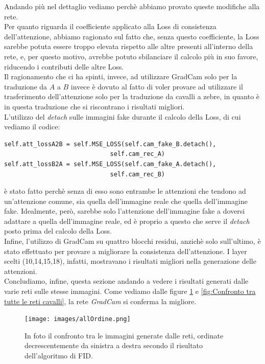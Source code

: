 Andando più nel dettaglio vediamo perchè abbiamo provato queste modifiche alla rete.
\\Per quanto riguarda il coefficiente applicato alla Loss di consistenza dell'attenzione, abbiamo ragionato sul fatto che, senza questo coefficiente, la Loss sarebbe potuta essere troppo elevata rispetto alle altre presenti all'interno della rete, e, per questo motivo, avrebbe potuto sbilanciare il calcolo più in suo favore, riducendo i contributi delle altre Loss.
\\Il ragionamento che ci ha spinti, invece, ad utilizzare GradCam solo per la traduzione da $A$ a $B$ invece è dovuto al fatto di voler provare ad utilizzare il trasferimento dell'attenzione solo per la traduzione da cavalli a zebre, in quanto è in questa traduzione che si riscontrano i risultati migliori.
\\L'utilizzo del \emph{detach} sulle immagini fake durante il calcolo della Loss, di cui vediamo il codice:
\begin{verbatim}
self.att_lossA2B = self.MSE_LOSS(self.cam_fake_B.detach(),
                             self.cam_rec_A)
self.att_lossB2A = self.MSE_LOSS(self.cam_fake_A.detach(),
                             self.cam_rec_B)
\end{verbatim}
è stato fatto perchè senza di esso sono entrambe le attenzioni che tendono ad un'attenzione comune, sia quella dell'immagine reale che quella dell'immagine fake. Idealmente, però, sarebbe solo l'attenzione dell'immagine fake a doversi adattare a quella dell'immagine reale, ed è proprio a questo che serve il \emph{detach} posto prima del calcolo della Loss.
\\Infine, l'utilizzo di GradCam su quattro blocchi residui, anzichè solo sull'ultimo, è stato effettuato per provare a migliorare la consistenza dell'attenzione. I layer scelti (10,14,15,18), infatti, mostravano i risultati migliori nella generazione delle attenzioni.
\\Concludiamo, infine, questa sezione andando a vedere i risultati generati dalle varie reti sulle stesse immagini. Come vediamo dalle figure \ref{fig:Confronto tra tutte le reti zebre} e \ref{fig:Confronto tra tutte le reti cavalli}, la rete \emph{GradCam} si conferma la migliore.


\begin{figure}[H]
\begin{center}
\texttt{[image: images/allOrdine.png]}
\end{center}
\caption{In foto il confronto tra le immagini generate dalle reti, ordinate decrescentemente da sinistra a destra secondo il risultato dell'algoritmo di FID.}
\label{fig:Confronto tra tutte le reti zebre}
\end{figure}  

